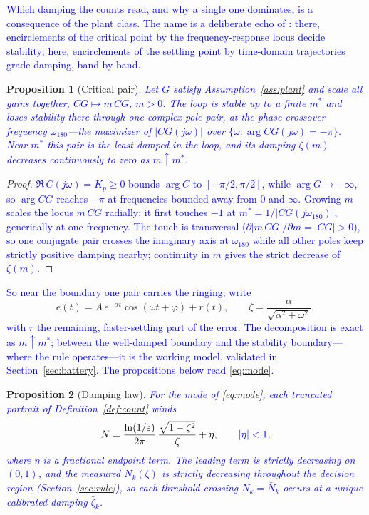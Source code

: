 \documentclass[final,3p,times,twocolumn]{elsarticle}
\newcommand{\revb}[1]{\textcolor{blue}{#1}} %
\newcommand{\revc}[1]{\textcolor{blue}{#1}} %
\newcommand{\revd}[1]{\textcolor{blue}{#1}} %
\newcommand{\reve}[1]{\textcolor{blue}{#1}} %
\newcommand{\revh}[1]{\textcolor{blue}{#1}} %
\newtheorem{proposition}{Proposition}
\begin{document}
\revc{Which damping the counts read, and why a single one
dominates, is a consequence of the plant class.} \revh{The name is a
deliberate echo of \cite{Nyquist1932}: there, encirclements of the
critical point by the frequency-response locus decide stability; here,
encirclements of the settling point by time-domain trajectories grade
damping, band by band.}

\begin{proposition}[Critical pair]\label{prop:pair}
\reve{Let $G$ satisfy Assumption~\ref{ass:plant} and scale all
gains together, $CG \mapsto m\,CG$, $m>0$. The loop is stable up to a
finite $m^\ast$ and loses stability there through one complex pole
pair, at the phase-crossover frequency $\omega_{180}$---the maximizer
of $|CG(j\omega)|$ over $\{\omega:\arg CG(j\omega)=-\pi\}$. Near
$m^\ast$ this pair is the least damped in the loop, and its damping
$\zeta(m)$ decreases continuously to zero as $m\uparrow m^\ast$.}
\end{proposition}

\begin{proof}
\reve{$\Re\,C(j\omega) = K_p \ge 0$ bounds $\arg C$ to
$[-\pi/2,\pi/2]$, while $\arg G \to -\infty$, so $\arg CG$ reaches
$-\pi$ at frequencies bounded away from $0$ and $\infty$. Growing $m$
scales the locus $m\,CG$ radially; it first touches $-1$ at
$m^\ast = 1/|CG(j\omega_{180})|$, generically at one frequency. The
touch is transversal ($\partial|m\,CG|/\partial m = |CG| > 0$), so one
conjugate pair crosses the imaginary axis at $\omega_{180}$ while all
other poles keep strictly positive damping nearby; continuity in $m$
gives the strict decrease of $\zeta(m)$.}
\end{proof}

\revd{So near the boundary one pair carries the ringing; write}
\begin{equation}
e(t) = A\,e^{-\alpha t}\cos(\omega t+\varphi) + r(t),
\qquad \zeta = \frac{\alpha}{\sqrt{\alpha^2+\omega^2}},
\label{eq:mode}
\end{equation}
\revd{with $r$ the remaining, faster-settling part of the error. The
decomposition is exact as $m \uparrow m^\ast$; between the well-damped
boundary and the stability boundary---where the rule operates---it is
the working model, validated in Section~\ref{sec:battery}. The
propositions below read \eqref{eq:mode}.}

\begin{proposition}[Damping law]\label{prop:law}
\revb{For the mode of \eqref{eq:mode}, each truncated portrait of
Definition~\ref{def:count} winds
\begin{equation}
N = \frac{\ln(1/\varepsilon)}{2\pi}\,
\frac{\sqrt{1-\zeta^2}}{\zeta} + \eta,
\qquad \revc{|\eta| < 1,}
\label{eq:law}
\end{equation}
where $\eta$ is a fractional endpoint term. \reve{The leading term
is strictly decreasing on $(0,1)$, and the measured $N_k(\zeta)$ is
strictly decreasing throughout the decision region (\revh{Section~\ref{sec:rule}}), so
each threshold crossing $N_k=\bar N_k$ occurs at a unique calibrated
damping $\bar\zeta_k$.}}
\end{proposition}
\end{document}
